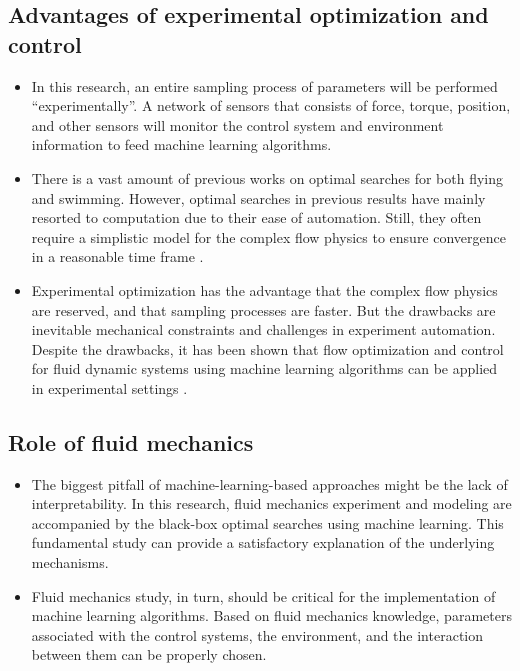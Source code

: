 \documentclass[12pt, a4paper]{article}
\providecommand{\tightlist}{%
  \setlength{\itemsep}{0pt}\setlength{\parskip}{0pt}}
\begin{document}
\hypertarget{advantages-of-experimental-optimization-and-control}{%
\subsection{Advantages of experimental optimization and
control}\label{advantages-of-experimental-optimization-and-control}}

\begin{itemize}
\tightlist
\item
  In this research, an entire sampling process of parameters will be
  performed ``experimentally''. A network of sensors that consists of
  force, torque, position, and other sensors will monitor the control
  system and environment information to feed machine learning
  algorithms.
\item
  There is a vast amount of previous works on optimal searches for both
  flying and swimming. However, optimal searches in previous results
  have mainly resorted to computation due to their ease of automation.
  Still, they often require a simplistic model for the complex flow
  physics to ensure convergence in a reasonable time frame
  \citep{Martin2018}.
\item
  Experimental optimization has the advantage that the complex flow
  physics are reserved, and that sampling processes are faster. But the
  drawbacks are inevitable mechanical constraints and challenges in
  experiment automation. Despite the drawbacks, it has been shown that
  flow optimization and control for fluid dynamic systems using machine
  learning algorithms can be applied in experimental settings
  \citep[\citet{Martin2018},\citet{Ramananarivo2019}]{Strom2017}.
\end{itemize}

\hypertarget{role-of-fluid-mechanics}{%
\subsection{Role of fluid mechanics}\label{role-of-fluid-mechanics}}

\begin{itemize}
\tightlist
\item
  The biggest pitfall of machine-learning-based approaches might be the
  lack of interpretability. In this research, fluid mechanics experiment
  and modeling are accompanied by the black-box optimal searches using
  machine learning. This fundamental study can provide a satisfactory
  explanation of the underlying mechanisms.
\item
  Fluid mechanics study, in turn, should be critical for the
  implementation of machine learning algorithms. Based on fluid
  mechanics knowledge, parameters associated with the control systems,
  the environment, and the interaction between them can be properly
  chosen.
\end{itemize}
\end{document}
